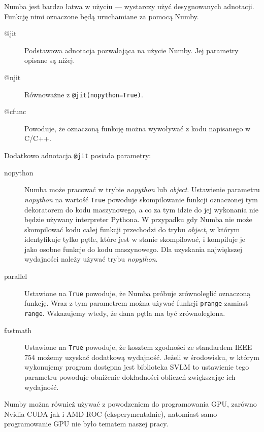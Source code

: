 Numba jest bardzo łatwa w użyciu --- wystarczy użyć desygnowanych
adnotacji.
Funkcję nimi oznaczone będą uruchamiane za pomocą Numby.
\begin{description}
    \item[@jit]
    Podstawowa adnotacja pozwalająca na użycie Numby.
    Jej parametry opisane są niżej.
    \item[@njit]
    Równoważne z \texttt{@jit(nopython=True)}.
    \item[@cfunc]
    Powoduje, że oznaczoną funkcję można wywoływać z kodu napisanego w C/C++.
\end{description}
Dodatkowo adnotacja \texttt{@jit} posiada parametry:
\begin{description}
    \item [nopython]
    Numba może pracować w trybie \textit{nopython} lub \textit{object}.
    Ustawienie parametru \textit{nopython} na wartość \texttt{True}
    powoduje skompilowanie
    funkcji oznaczonej tym dekoratorem do kodu maszynowego, a co za tym idzie
    do jej wykonania nie będzie używany interpreter Pythona.
    W przypadku gdy Numba nie może skompilować kodu całej funkcji
    przechodzi do trybu \textit{object}, w którym identyfikuje tylko pętle,
    które jest w stanie skompilować, i kompiluje je jako osobne funkcje
    do kodu maszynowego.
    Dla uzyskania największej wydajności należy używać trybu \textit{nopython}.
    \item [parallel]
    Ustawione na \texttt{True} powoduje, że Numba próbuje
    zrównoleglić oznaczoną funkcję.
    Wraz z tym parametrem można używać funkcji \texttt{prange}
    zamiast \texttt{range}.
    Wskazujemy wtedy, że dana pętla ma być zrównoleglona.
    \item [fastmath]
    Ustawione na \texttt{True} powoduje, że kosztem zgodności
    ze standardem IEEE 754 możemy uzyskać dodatkową wydajność.
    Jeżeli w środowisku, w którym wykonujemy program dostępna jest
    biblioteka SVLM to ustawienie tego parametru powoduje obniżenie
    dokładności obliczeń zwiększając ich wydajność.
\end{description}

Numby można również używać z powodzeniem do programowania GPU,
zarówno Nvidia CUDA jak i AMD ROC (eksperymentalnie),
natomiast samo programowanie GPU nie było tematem naszej pracy.

